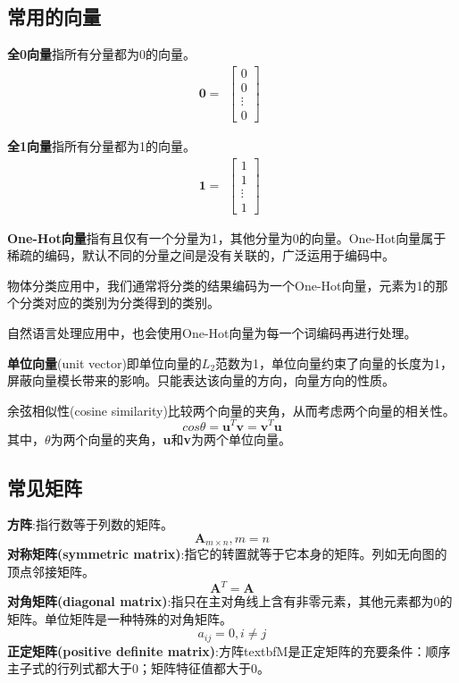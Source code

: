 \documentclass[openbib]{article}
\begin{document}
\subsection{常用的向量}
\textbf{全0向量}指所有分量都为0的向量。
$$\textbf{0}= \begin{aligned}
	\begin{bmatrix}
		0 \\0  \\ \vdots \\ 0
	\end{bmatrix}
\end{aligned}$$ 

\textbf{全1向量}指所有分量都为1的向量。
$$\textbf{1}= \begin{aligned}
	\begin{bmatrix}
		1 \\1  \\ \vdots \\ 1
	\end{bmatrix}
\end{aligned}$$ 

\textbf{One-Hot向量}指有且仅有一个分量为1，其他分量为0的向量。One-Hot向量属于稀疏的编码，默认不同的分量之间是没有关联的，广泛运用于编码中。

物体分类应用中，我们通常将分类的结果编码为一个One-Hot向量，元素为1的那个分类对应的类别为分类得到的类别。

自然语言处理应用中，也会使用One-Hot向量为每一个词编码再进行处理。

\textbf{单位向量}(unit vector)即单位向量的$L_2$范数为1，单位向量约束了向量的长度为1，屏蔽向量模长带来的影响。只能表达该向量的方向，向量方向的性质。

余弦相似性(cosine similarity)比较两个向量的夹角，从而考虑两个向量的相关性。
$$cos\theta = \textbf{u}^T\textbf{v}=\textbf{v}^T\textbf{u}$$
其中，$\theta$为两个向量的夹角，\textbf{u}和\textbf{v}为两个单位向量。

\subsection{常见矩阵}
\textbf{方阵}:指行数等于列数的矩阵。
$$\textbf{A}_{m\times n}, m=n$$
\textbf{对称矩阵(symmetric matrix)}:指它的转置就等于它本身的矩阵。列如无向图的顶点邻接矩阵。
$$\textbf{A}^T = \textbf{A}$$
\textbf{对角矩阵(diagonal matrix)}:指只在主对角线上含有非零元素，其他元素都为0的矩阵。单位矩阵是一种特殊的对角矩阵。
$$a_{ij}=0,i\neq j$$
\textbf{正定矩阵(positive definite matrix)}:方阵textbf{M}是正定矩阵的充要条件：顺序主子式的行列式都大于0；矩阵特征值都大于0。
\end{document}
